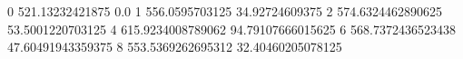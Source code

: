 0 521.13232421875 0.0
1 556.0595703125 34.92724609375
2 574.6324462890625 53.5001220703125
4 615.9234008789062 94.79107666015625
6 568.7372436523438 47.60491943359375
8 553.5369262695312 32.40460205078125
